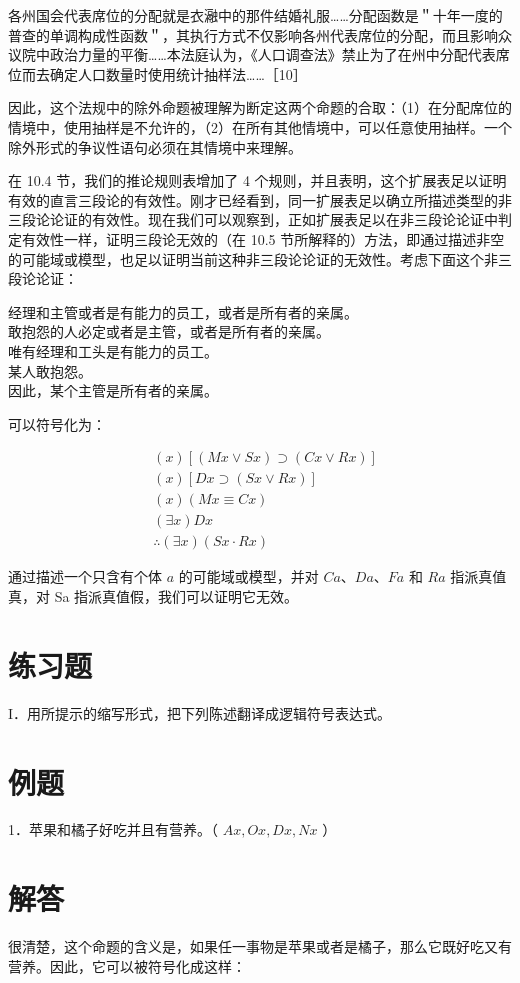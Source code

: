 各州国会代表席位的分配就是衣瀜中的那件结婚礼服……分配函数是＂十年一度的普查的单调构成性函数＂，其执行方式不仅影响各州代表席位的分配，而且影响众议院中政治力量的平衡……本法庭认为，《人口调查法》禁止为了在州中分配代表席位而去确定人口数量时使用统计抽样法……［10］

因此，这个法规中的除外命题被理解为断定这两个命题的合取：（1）在分配席位的情境中，使用抽样是不允许的，（2）在所有其他情境中，可以任意使用抽样。一个除外形式的争议性语句必须在其情境中来理解。

在 10.4 节，我们的推论规则表增加了 4 个规则，并且表明，这个扩展表足以证明有效的直言三段论的有效性。刚才已经看到，同一扩展表足以确立所描述类型的非三段论论证的有效性。现在我们可以观察到，正如扩展表足以在非三段论论证中判定有效性一样，证明三段论无效的（在 10.5 节所解释的）方法，即通过描述非空的可能域或模型，也足以证明当前这种非三段论论证的无效性。考虑下面这个非三段论论证：

经理和主管或者是有能力的员工，或者是所有者的亲属。\\
敢抱怨的人必定或者是主管，或者是所有者的亲属。\\
唯有经理和工头是有能力的员工。\\
某人敢抱怨。\\
因此，某个主管是所有者的亲属。

可以符号化为：

$$
\begin{aligned}
& (x)[(M x \vee S x) \supset(C x \vee R x)] \\
& (x)[D x \supset(S x \vee R x)] \\
& (x)(M x \equiv C x) \\
& (\exists x) D x \\
& \therefore(\exists x)(S x \cdot R x)
\end{aligned}
$$

通过描述一个只含有个体 $a$ 的可能域或模型，并对 $C a 、 D a 、 F a$ 和 $R a$ 指派真值真，对 Sa 指派真值假，我们可以证明它无效。

\section*{练习题}
I．用所提示的缩写形式，把下列陈述翻译成逻辑符号表达式。

\section*{例题}
1．苹果和橘子好吃并且有营养。（ $A x, O x, D x, N x$ ）

\section*{解答}
很清楚，这个命题的含义是，如果任一事物是苹果或者是橘子，那么它既好吃又有营养。因此，它可以被符号化成这样：


